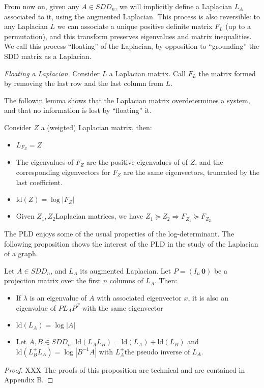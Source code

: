 From now on, given any $A\in SDD_{n}$, we will implicitly define
a Laplacian $L_{A}$ associated to it, using the augmented Laplacian.
This process is also reversible: to any Laplacian $L$ we can associate
a unique positive definite matrix $F_{L}$ (up to a permutation),
and this transform preserves eigenvalues and matrix inequalities.
We call this process ``floating'' of the Laplacian, by opposition
to ``grounding'' the SDD matrix as a Laplacian. 

\begin{definition}\emph{Floating a Laplacian}. Consider $L$ a Laplacian
matrix. Call $F_{L}$ the matrix formed by removing the last row and
the last column from $L$.

\end{definition}

The followin lemma shows that the Laplacian matrix overdetermines
a system, and that no information is lost by ``floating'' it.

\begin{lemma}Consider $Z$ a (weigted) Laplacian matrix, then:
\begin{itemize}
\item $L_{F_{Z}}=Z$
\item The eigenvalues of $F_{Z}$ are the positive eigenvalues of of $Z$,
and the corresponding eigenvectors for $F_{Z}$ are the same eigenvectors,
truncated by the last coefficient.
\item $\text{ld}\left(Z\right)=\log\left|F_{Z}\right|$
\item Given $Z_{1},Z_{2}$Laplacian matrices, we have $Z_{1}\succeq Z_{2}\Rightarrow F_{Z_{1}}\succeq F_{Z_{2}}$
\end{itemize}
\end{lemma}

The PLD enjoys some of the usual properties of the log-determinant.
The following proposition shows the interest of the PLD in the study
of the Laplacian of a graph. 

\begin{proposition} \label{pro:pld-properties}Let $A\in SDD_{n}$,
and $L_{A}$ its augmented Laplacian. Let $P=\left(I_{n}\,\mathbf{0}\right)$
be a projection matrix over the first $n$ columns of $L_{A}$. Then:\end{proposition} 
\begin{itemize}
\item If $\lambda$ is an eigenvalue of $A$ with associated eigenvector
$x$, it is also an eigenvalue of $PL_{A}P^{T}$ with the same eigenvector 
\item $\text{ld}\left(L_{A}\right)=\log\left|A\right|$ 
\item Let $A,B\in SDD_{n}$. $\text{ld}\left(L_{A}L_{B}\right)=\text{ld}\left(L_{A}\right)+\text{ld}\left(L_{B}\right)$
and $\text{ld}\left(L_{B}^{+}L_{A}\right)=\log\left|B^{-1}A\right|$
with $L_{A}^{+}$the pseudo inverse of $L_{A}$. 
\end{itemize}
\begin{proof}XXX The proofs of this proposition are technical and
are contained in Appendix B. \end{proof} 

